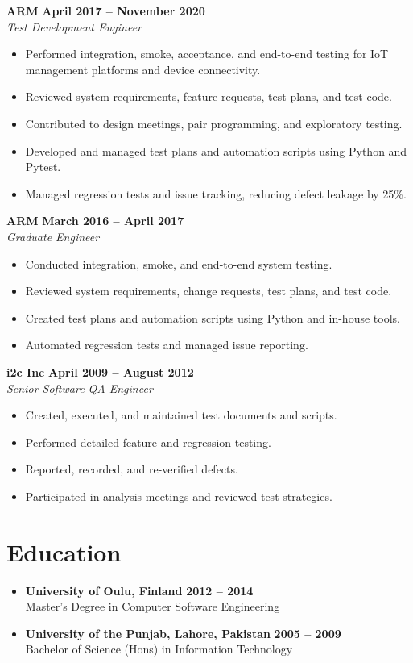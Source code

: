 \documentclass[12pt]{article}
\begin{document}
\textbf{ARM} \hfill \textbf{April 2017 – November 2020} \\
\textit{Test Development Engineer} \\
\begin{itemize}
    \item Performed integration, smoke, acceptance, and end-to-end testing for IoT management platforms and device connectivity.
    \item Reviewed system requirements, feature requests, test plans, and test code.
    \item Contributed to design meetings, pair programming, and exploratory testing.
    \item Developed and managed test plans and automation scripts using Python and Pytest.
    \item Managed regression tests and issue tracking, reducing defect leakage by 25\%.
\end{itemize}

\textbf{ARM} \hfill \textbf{March 2016 – April 2017} \\
\textit{Graduate Engineer} \\
\begin{itemize}
    \item Conducted integration, smoke, and end-to-end system testing.
    \item Reviewed system requirements, change requests, test plans, and test code.
    \item Created test plans and automation scripts using Python and in-house tools.
    \item Automated regression tests and managed issue reporting.
\end{itemize}

\textbf{i2c Inc} \hfill \textbf{April 2009 – August 2012} \\
\textit{Senior Software QA Engineer} \\
\begin{itemize}
    \item Created, executed, and maintained test documents and scripts.
    \item Performed detailed feature and regression testing.
    \item Reported, recorded, and re-verified defects.
    \item Participated in analysis meetings and reviewed test strategies.
\end{itemize}

\section{Education}
\begin{itemize}[leftmargin=1.5em]
    \item \textbf{University of Oulu, Finland} \hfill \textbf{2012 – 2014} \\
    Master's Degree in Computer Software Engineering

    \item \textbf{University of the Punjab, Lahore, Pakistan} \hfill \textbf{2005 – 2009} \\
    Bachelor of Science (Hons) in Information Technology
\end{itemize}
\end{document}
